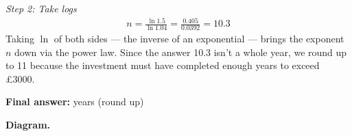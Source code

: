 \documentclass[11pt]{article}
\begin{document}
\textit{Step 2: Take logs}
\[\begin{gathered}
n = \frac{\ln 1.5}{\ln 1.04} = \frac{0.405}{0.0392} = 10.3
\end{gathered}\]
Taking \( \ln \) of both sides --- the inverse of an exponential --- brings the exponent \( n \) down via the power law. Since the answer 10.3 isn't a whole year, we round up to 11 because the investment must have completed enough years to exceed \pounds 3000.

\begin{answerbox}
\textbf{Final answer:} years (round up)
\end{answerbox}
\textbf{Diagram.}

\begin{center}
\end{center}
\end{document}
